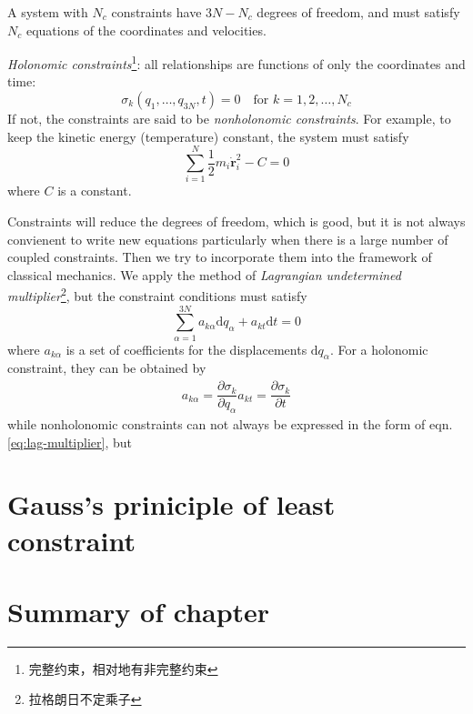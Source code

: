 \documentclass[
  10pt,
  twoside,
  openany,
  b5paper, %
  colorscheme = bootstrap-v4, %
]{qyxf-book}
\numberwithin{equation}{section}
\newcommand{\md}{\mathrm{d}}
\newcommand{\p}[2]{\dfrac{\partial #1}{\partial #2}}
\newcommand{\vr}{\boldsymbol{r}}
\newcommand{\dvr}{\dot{\vr}}
\newcommand{\half}{\dfrac{1}{2}}
\newcommand{\sumin}{\sum_{i=1}^N}
\newcommand{\suman}{\sum_{\alpha=1}^{3N}}
\begin{document}
A system with $N_c$ constraints have $3N-N_c$ degrees of freedom, and must satisfy $N_c$ equations of the coordinates and velocities.

\textit{Holonomic constraints}\footnote{完整约束，相对地有非完整约束}: all relationships are functions of only the coordinates and time:
\begin{equation}
	\sigma_k(q_1,\dots,q_{3N},t)=0\quad \text{for } k=1,2,\dots,N_c
\end{equation}
If not, the constraints are said to be \textit{nonholonomic constraints}. For example, to keep the kinetic energy (temperature) constant, the system must satisfy
\begin{equation*}
	\sumin\half m_i\dvr_i^2-C=0
\end{equation*}
where $C$ is a constant.

Constraints will reduce the degrees of freedom, which is good, but it is not always convienent to write new equations particularly when there is a large number of coupled constraints. 
Then we try to incorporate them into the framework of classical mechanics.
We apply the method of \textit{Lagrangian undetermined multiplier}\footnote{拉格朗日不定乘子}, but the constraint conditions must satisfy
\begin{equation}
	\suman a_{k\alpha}\md q_\alpha+a_{kt}\md t=0 \label{eq:lag-multiplier}
\end{equation}
where $a_{k\alpha}$ is a set of coefficients for the displacements $\md q_\alpha$. For a holonomic constraint, they can be obtained by
\begin{gather}
	a_{k\alpha}=\p{\sigma_k}{q_\alpha}
	a_{kt}=\p{\sigma_k}{t}
\end{gather}
while nonholonomic constraints can not always be expressed in the form of eqn. \ref{eq:lag-multiplier}, but 

\section{Gauss's priniciple of least constraint}





\section{}


\section{Summary of chapter}
\end{document}
